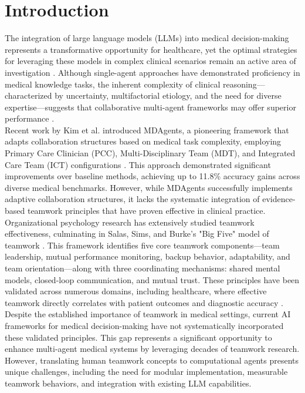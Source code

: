 \documentclass[letterpaper]{article} %
\begin{document}
\section{Introduction}
The integration of large language models (LLMs) into medical decision-making represents a transformative opportunity for healthcare, yet the optimal strategies for leveraging these models in complex clinical scenarios remain an active area of investigation \cite{kim2024mdagents}. Although single-agent approaches have demonstrated proficiency in medical knowledge tasks, the inherent complexity of clinical reasoning—characterized by uncertainty, multifactorial etiology, and the need for diverse expertise—suggests that collaborative multi-agent frameworks may offer superior performance \cite{kim2024mdagents}.\\

Recent work by Kim et al. introduced MDAgents, a pioneering framework that adapts collaboration structures based on medical task complexity, employing Primary Care Clinician (PCC), Multi-Disciplinary Team (MDT), and Integrated Care Team (ICT) configurations \cite{kim2024mdagents}. This approach demonstrated significant improvements over baseline methods, achieving up to 11.8\% accuracy gains across diverse medical benchmarks. However, while MDAgents successfully implements adaptive collaboration structures, it lacks the systematic integration of evidence-based teamwork principles that have proven effective in clinical practice.\\

Organizational psychology research has extensively studied teamwork effectiveness, culminating in Salas, Sims, and Burke's "Big Five" model of teamwork \cite{salas2005big}. This framework identifies five core teamwork components—team leadership, mutual performance monitoring, backup behavior, adaptability, and team orientation—along with three coordinating mechanisms: shared mental models, closed-loop communication, and mutual trust. These principles have been validated across numerous domains, including healthcare, where effective teamwork directly correlates with patient outcomes and diagnostic accuracy \cite{baker2006teamstepps}.\\

Despite the established importance of teamwork in medical settings, current AI frameworks for medical decision-making have not systematically incorporated these validated principles. This gap represents a significant opportunity to enhance multi-agent medical systems by leveraging decades of teamwork research. However, translating human teamwork concepts to computational agents presents unique challenges, including the need for modular implementation, measurable teamwork behaviors, and integration with existing LLM capabilities.\\
\end{document}
